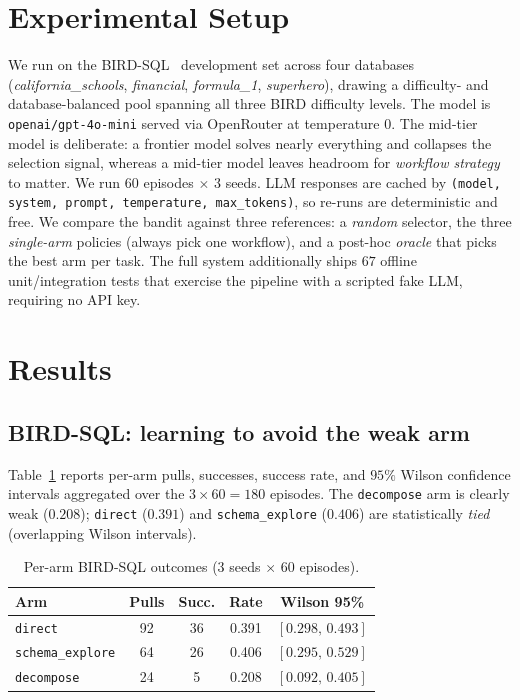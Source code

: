 \documentclass[conference]{IEEEtran}
\newcommand{\code}[1]{\texttt{#1}}
\begin{document}
\section{Experimental Setup}
We run on the BIRD-SQL~\cite{bird} development set across four databases
(\textit{california\_schools}, \textit{financial}, \textit{formula\_1},
\textit{superhero}), drawing a difficulty- and database-balanced pool spanning all
three BIRD difficulty levels. The model is \code{openai/gpt-4o-mini} served via
OpenRouter at temperature $0$. The mid-tier model is deliberate: a frontier model
solves nearly everything and collapses the selection signal, whereas a mid-tier
model leaves headroom for \emph{workflow strategy} to matter. We run $60$ episodes
$\times$ $3$ seeds. LLM responses are cached by
\code{(model, system, prompt, temperature, max\_tokens)}, so re-runs are deterministic
and free. We compare the bandit against three references: a \emph{random} selector,
the three \emph{single-arm} policies (always pick one workflow), and a post-hoc
\emph{oracle} that picks the best arm per task. The full system additionally ships
$67$ offline unit/integration tests that exercise the pipeline with a scripted fake
LLM, requiring no API key.

\section{Results}
\subsection{BIRD-SQL: learning to avoid the weak arm}
Table~\ref{tab:arms} reports per-arm pulls, successes, success rate, and $95\%$
Wilson confidence intervals aggregated over the $3{\times}60=180$ episodes. The
\code{decompose} arm is clearly weak ($0.208$); \code{direct} ($0.391$) and
\code{schema\_explore} ($0.406$) are statistically \emph{tied} (overlapping Wilson
intervals).

\begin{table}[h]
\centering
\caption{Per-arm BIRD-SQL outcomes (3 seeds $\times$ 60 episodes).}
\label{tab:arms}
\small
\begin{tabular}{lcccc}
\toprule
Arm & Pulls & Succ. & Rate & Wilson 95\% \\
\midrule
\code{direct}          & 92 & 36 & 0.391 & $[0.298,\,0.493]$ \\
\code{schema\_explore} & 64 & 26 & 0.406 & $[0.295,\,0.529]$ \\
\code{decompose}       & 24 &  5 & 0.208 & $[0.092,\,0.405]$ \\
\bottomrule
\end{tabular}
\end{table}
\end{document}
